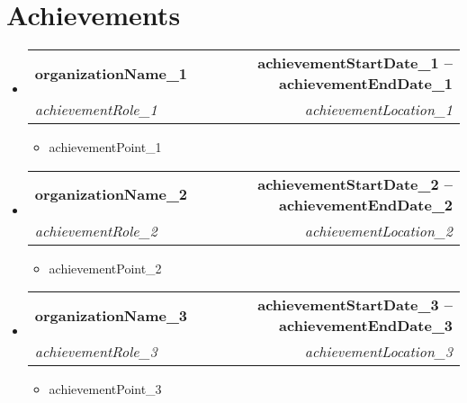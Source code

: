 \documentclass[letterpaper,11pt]{article}
\makeatletter
\newcommand{\resumeItem}[1]{
  \item\small{
    {#1 \vspace{-2pt}}
  }
}
\newcommand{\resumeSubheading}[4]{
  \vspace{-2pt}\item
    \begin{tabular*}{1.0\textwidth}[t]{l@{\extracolsep{\fill}}r}
      \textbf{#1} & \textbf{\small #2} \\
      \textit{\small#3} & \textit{\small #4} \\
    \end{tabular*}\vspace{-7pt}
}
\newcommand{\resumeSubHeadingListStart}{\begin{itemize}[leftmargin=0.0in, label={}]}
\newcommand{\resumeSubHeadingListEnd}{\end{itemize}}
\newcommand{\resumeItemListStart}{\begin{itemize}}
\newcommand{\resumeItemListEnd}{\end{itemize}\vspace{-5pt}}
\makeatother
\begin{document}
\section{Achievements}
\resumeSubHeadingListStart
    \resumeSubheading
        { {{organizationName_1}} }{ {{achievementStartDate_1}} -- {{achievementEndDate_1}} }{ {{achievementRole_1}} }{ {{achievementLocation_1}} }
        \resumeItemListStart
            \resumeItem{ {{achievementPoint_1}} }
        \resumeItemListEnd
    \resumeSubheading
        { {{organizationName_2}} }{ {{achievementStartDate_2}} -- {{achievementEndDate_2}} }{ {{achievementRole_2}} }{ {{achievementLocation_2}} }
        \resumeItemListStart
            \resumeItem{ {{achievementPoint_2}} }
        \resumeItemListEnd
    \resumeSubheading
        { {{organizationName_3}} }{ {{achievementStartDate_3}} -- {{achievementEndDate_3}} }{ {{achievementRole_3}} }{ {{achievementLocation_3}} }
        \resumeItemListStart
            \resumeItem{ {{achievementPoint_3}} }
        \resumeItemListEnd
\resumeSubHeadingListEnd
\end{document}

